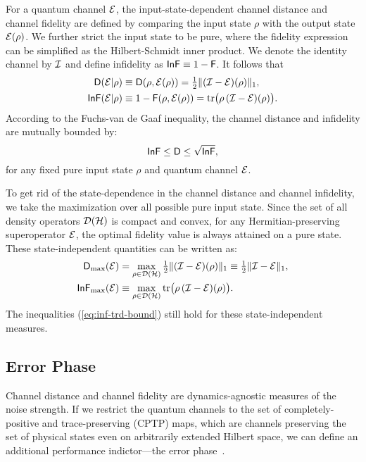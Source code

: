 \documentclass[aps,pra,reprint,superscriptaddress]{revtex4-2}
\begin{document}
For a quantum channel $\mathcal{E}$, the input-state-dependent channel distance and channel fidelity are defined by comparing the input state $\rho$ with the output state $\mathcal{E}(\rho)$. We further strict the input state to be pure, where the fidelity expression can be simplified as the Hilbert-Schmidt inner product.
We denote the identity channel by $\mathcal{I}$ and define infidelity as $\operatorname{\mathsf{InF}} \equiv 1- \operatorname{\mathsf{F}}$. It follows that 
\begin{align}\label{eq:trd-def}
    \operatorname{\mathsf{D}}(\mathcal{E}|\rho) &\equiv \operatorname{\mathsf{D}}(\rho, \mathcal{E}(\rho)) = \tfrac{1}{2} \Vert { (\mathcal{I}-\mathcal{E}) (\rho)} \Vert_1, \\
    \operatorname{\mathsf{InF}}(\mathcal{E}|\rho) &\equiv 1- \operatorname{\mathsf{F}}(\rho, \mathcal{E}(\rho)) = \operatorname{tr}\bigl(\rho\, (\mathcal{I} -\mathcal{E})(\rho)\bigr).\label{eq:inf-def}
\end{align}
According to the Fuchs-van de Gaaf inequality, the channel distance and infidelity are mutually bounded by:
\begin{equation}\label{eq:inf-trd-bound}
    \operatorname{\mathsf{InF}} \le \operatorname{\mathsf{D}} \le \sqrt{\operatorname{\mathsf{InF}}},
\end{equation} 
for any fixed pure input state $\rho$ and quantum channel $\mathcal{E}$.

To get rid of the state-dependence in the channel distance and channel infidelity, we take the maximization over all possible pure input state.
Since the set of all density operators $\mathcal{D}(\mathcal{H})$ is compact and convex, for any Hermitian-preserving superoperator $\mathcal{E}$, the optimal fidelity value is  always attained on a pure state. These state-independent quantities can be written as:
\begin{align}\label{eq:Dmax-channel}
\operatorname{\mathsf{D}}_{\max}(\mathcal{E}) &= \max_{\rho\in\mathcal{D}(\mathcal{H})} \tfrac{1}{2} \Vert { (\mathcal{I}-\mathcal{E}) (\rho)} \Vert_1 \equiv \tfrac{1}{2} \Vert { \mathcal{I}-\mathcal{E}} \Vert_1, \\
\operatorname{\mathsf{InF}}_{\max}(\mathcal{E}) &\equiv \max_{\rho\in\mathcal{D}(\mathcal{H})} \operatorname{tr}\bigl(\rho\, (\mathcal{I} -\mathcal{E})(\rho)\bigr).\label{eq:InFmax-channel}
\end{align}
The inequalities (\ref{eq:inf-trd-bound}) still hold for these state-independent measures.

\subsection{Error Phase}
Channel distance and channel fidelity are dynamics-agnostic measures of the noise strength. If we restrict the quantum channels to the set of completely-positive and trace-preserving (CPTP) maps, which are channels preserving the set of physical states even on arbitrarily extended Hilbert space, we can define an additional performance indictor---the error phase~\cite{khodjasteh2007performance}. 
\end{document}
